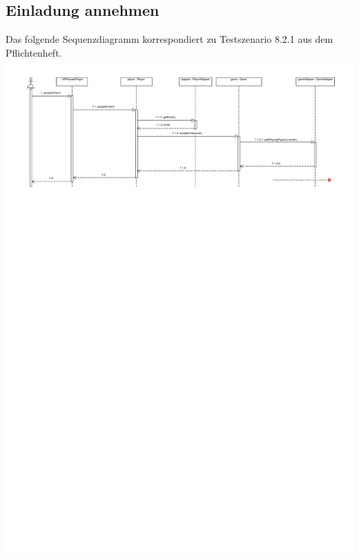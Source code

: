 \documentclass[a4paper]{scrreprt}
\begin{document}
	\subsection{Einladung annehmen}
	Das folgende Sequenzdiagramm korrespondiert zu Testszenario 8.2.1 aus dem Pflichtenheft. \\
	\includegraphics[width=\textwidth]{img/Einladung_annehmen.pdf}
\end{document}
